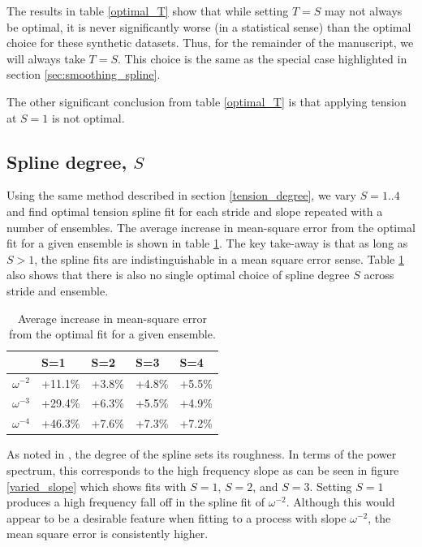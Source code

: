\documentclass[10pt,journal]{IEEEtran}
\begin{document}
The results in table \ref{optimal_T} show that while setting $T=S$ may not always be optimal, it is never significantly worse (in a statistical sense) than the optimal choice for these synthetic datasets. Thus, for the remainder of the manuscript, we will always take $T=S$. This choice is the same as the special case highlighted in section \ref{sec:smoothing_spline}.

The other significant conclusion from table \ref{optimal_T} is that applying tension at $S=1$ is not optimal.

\subsection{Spline degree, $S$} \label{spline_degree}

Using the same method described in section \ref{tension_degree}, we vary $S=1..4$ and find optimal tension spline fit for each stride and slope repeated with a number of ensembles. The average increase in mean-square error from the optimal fit for a given ensemble is shown in table \ref{optimal_S}. The key take-away is that as long as $S > 1$, the spline fits are indistinguishable in a mean square error sense. Table \ref{optimal_S} also shows that there is also no single optimal choice of spline degree $S$ across stride and ensemble.

\begin{table}[ht]
\caption{Average increase in mean-square error from the optimal fit for a given ensemble.}
\label{optimal_S}
\centering
\begin{tabular}{r | llll}  & S=1 & S=2 & S=3 & S=4 \\ \hline \hline 
$\omega^{-2}$ & +11.1\% & +3.8\% & +4.8\% & +5.5\%  \\ 
$\omega^{-3}$ & +29.4\% & +6.3\% & +5.5\% & +4.9\%  \\ 
$\omega^{-4}$ & +46.3\% & +7.6\% & +7.3\% & +7.2\%  \\ 
\end{tabular} 
\end{table}

As noted in \cite{craven1979-nm}, the degree of the spline sets its roughness. In terms of the power spectrum, this corresponds to the high frequency slope as can be seen in figure \ref{varied_slope} which shows fits with $S=1$, $S=2$, and $S=3$. Setting $S=1$ produces a high frequency fall off in the spline fit of $\omega^{-2}$. Although this would appear to be a desirable feature when fitting to a process with slope $\omega^{-2}$, the mean square error is consistently higher.
\end{document}
